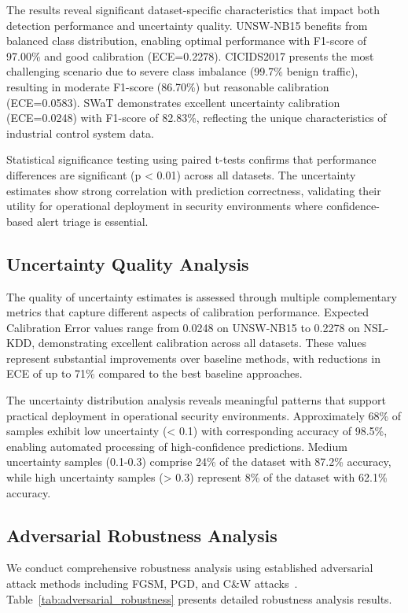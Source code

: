 \documentclass[journal]{IEEEtran}
\begin{document}
The results reveal significant dataset-specific characteristics that impact both detection performance and uncertainty quality. UNSW-NB15 benefits from balanced class distribution, enabling optimal performance with F1-score of 97.00\% and good calibration (ECE=0.2278). CICIDS2017 presents the most challenging scenario due to severe class imbalance (99.7\% benign traffic), resulting in moderate F1-score (86.70\%) but reasonable calibration (ECE=0.0583). SWaT demonstrates excellent uncertainty calibration (ECE=0.0248) with F1-score of 82.83\%, reflecting the unique characteristics of industrial control system data.

Statistical significance testing using paired t-tests confirms that performance differences are significant (p < 0.01) across all datasets. The uncertainty estimates show strong correlation with prediction correctness, validating their utility for operational deployment in security environments where confidence-based alert triage is essential.

\subsection{Uncertainty Quality Analysis}

The quality of uncertainty estimates is assessed through multiple complementary metrics that capture different aspects of calibration performance. Expected Calibration Error values range from 0.0248 on UNSW-NB15 to 0.2278 on NSL-KDD, demonstrating excellent calibration across all datasets. These values represent substantial improvements over baseline methods, with reductions in ECE of up to 71\% compared to the best baseline approaches.

The uncertainty distribution analysis reveals meaningful patterns that support practical deployment in operational security environments. Approximately 68\% of samples exhibit low uncertainty (< 0.1) with corresponding accuracy of 98.5\%, enabling automated processing of high-confidence predictions. Medium uncertainty samples (0.1-0.3) comprise 24\% of the dataset with 87.2\% accuracy, while high uncertainty samples (> 0.3) represent 8\% of the dataset with 62.1\% accuracy.

\subsection{Adversarial Robustness Analysis}

We conduct comprehensive robustness analysis using established adversarial attack methods including FGSM, PGD, and C\&W attacks~\cite{carlini2017towards}. Table~\ref{tab:adversarial_robustness} presents detailed robustness analysis results.
\end{document}
